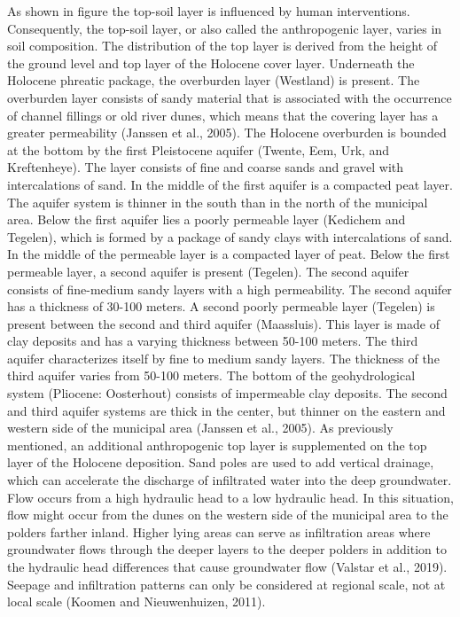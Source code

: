 As shown in figure  the top-soil layer is influenced by human interventions. Consequently, the top-soil layer, or also called the anthropogenic layer, varies in soil composition. The distribution of the top layer is derived from the height of the ground level and top layer of the Holocene cover layer. Underneath the Holocene phreatic package, the overburden layer (Westland) is present. The overburden layer consists of sandy material that is associated with the occurrence of channel fillings or old river dunes, which means that the covering layer has a greater permeability (Janssen et al., 2005). The Holocene overburden is bounded at the bottom by the first Pleistocene aquifer (Twente, Eem, Urk, and Kreftenheye). The layer consists of fine and coarse sands and gravel with intercalations of sand. In the middle of the first aquifer is a compacted peat layer. The aquifer system is thinner in the south than in the north of the municipal area. Below the first aquifer lies a poorly permeable layer (Kedichem and Tegelen), which is formed by a package of sandy clays with intercalations of sand. In the middle of the permeable layer is a compacted layer of peat. Below the first permeable layer, a second aquifer is present (Tegelen). The second aquifer consists of fine-medium sandy layers with a high permeability. The second aquifer has a thickness of 30-100 meters. A second poorly permeable layer (Tegelen) is present between the second and third aquifer (Maassluis). This layer is made of clay deposits and has a varying thickness between 50-100 meters. The third aquifer characterizes itself by fine to medium sandy layers. The thickness of the third aquifer varies from 50-100 meters. The bottom of the geohydrological system (Pliocene: Oosterhout) consists of impermeable clay deposits. The second and third aquifer systems are thick in the center, but thinner on the eastern and western side of the municipal area (Janssen et al., 2005). As previously mentioned, an additional anthropogenic top layer is supplemented on the top layer of the Holocene deposition. Sand poles are used to add vertical drainage, which can accelerate the discharge of infiltrated water into the deep groundwater. Flow occurs from a high hydraulic head to a low hydraulic head. In this situation, flow might occur from the dunes on the western side of the municipal area to the polders farther inland. Higher lying areas can serve as infiltration areas where groundwater flows through the deeper layers to the deeper polders in addition to the hydraulic head differences that cause groundwater flow (Valstar et al., 2019). Seepage and infiltration patterns can only be considered at regional scale, not at local scale (Koomen and Nieuwenhuizen, 2011). \\
